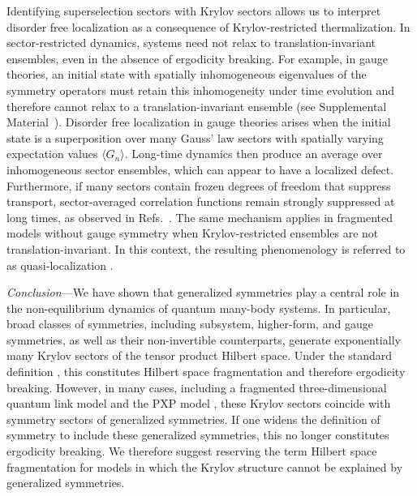 \documentclass[
 reprint,
 amsmath,amssymb,
 aps,floatfix,prl,superscriptaddress
]{revtex4-2}
\newcounter{paranum}
\renewcommand{\theparanum}{\Roman{paranum}} %
\newcommand{\pnum}[1]{%
  \textit{#1}---}
\begin{document}
Identifying superselection sectors with Krylov sectors allows us to interpret disorder free localization \cite{Smith_2017, Gyawali:2024hrz, Halimeh:2025vvp,Karpov:2020nhy,Halimeh:2021nep,Li:2021lay,Papaefstathiou:2020rvv,Jeyaretnam_2025} as a consequence of Krylov-restricted thermalization. In sector-restricted dynamics, systems need not relax to translation-invariant ensembles, even in the absence of ergodicity breaking. For example, in gauge theories, an initial state with spatially inhomogeneous eigenvalues of the symmetry operators must retain this inhomogeneity under time evolution and therefore cannot relax to a translation-invariant ensemble (see Supplemental Material~\cite{suppmat}).
Disorder free localization in gauge theories arises when the initial state is a superposition over many Gauss' law sectors with spatially varying expectation values $\langle G_n \rangle$. Long-time dynamics then produce an average over inhomogeneous sector ensembles, which can appear to have a localized defect. Furthermore, if many sectors contain frozen degrees of freedom that suppress transport, sector-averaged correlation functions remain strongly suppressed at long times, as observed in Refs.~\cite{Karpov:2020nhy,Smith:2018smg}.
The same mechanism applies in fragmented models without gauge symmetry when Krylov-restricted ensembles are not translation-invariant. In this context, the resulting phenomenology is referred to as quasi-localization \cite{Sala_2020, Moudgalya_2022}.


\pnum{Conclusion}We have shown that generalized symmetries play a central role in the non-equilibrium dynamics of quantum many-body systems. In particular, broad classes of symmetries, including subsystem, higher-form, and gauge symmetries, as well as their non-invertible counterparts, generate exponentially many Krylov sectors of the tensor product Hilbert space.
Under the standard definition \cite{sohal2025, moudgalya_quantum_2021}, this constitutes Hilbert space fragmentation and therefore ergodicity breaking. However, in many cases, including a fragmented three-dimensional quantum link model \cite{Steinegger2025} and the PXP model \cite{moudgalya_quantum_2021}, these Krylov sectors coincide with symmetry sectors of generalized symmetries. If one widens the definition of symmetry to include these generalized symmetries, this no longer constitutes ergodicity breaking. We therefore suggest reserving the term Hilbert space fragmentation for models in which the Krylov structure cannot be explained by generalized symmetries.
\end{document}
